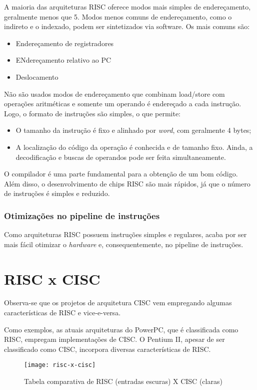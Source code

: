 A maioria das arquiteturas RISC oferece modos mais simples de endereçamento, geralmente menos que 5. Modos menos comuns de endereçamento, como o indireto e o indexado, podem ser sintetizados via software. Os mais comuns são:
\begin{itemize}
  \item Endereçamento de registradores
  \item ENdereçamento relativo ao PC
  \item Deslocamento
\end{itemize}

Não são usados modos de endereçamento que combinam load/store com operações aritméticas e somente um operando é endereçado a cada instrução. Logo, o formato de instruções são simples, o que permite:
\begin{itemize}
  \item O tamanho da instrução é fixo e alinhado por \textit{word}, com geralmente 4 bytes;

  \item A localização do código da operação é conhecida e de tamanho fixo. Ainda, a decodificação e buscas de operandos pode ser feita simultaneamente.
\end{itemize}

O compilador é uma parte fundamental para a obtenção de um bom código. Além disso, o desenvolvimento de chips RISC são mais rápidos, já que o número de instruções é simples e reduzido.




\subsubsection{Otimizações no pipeline de instruções}
Como arquiteturas RISC possuem instruções simples e regulares, acaba por ser mais fácil otimizar o \textit{hardware} e, consequentemente, no pipeline de instruções.





\section{RISC x CISC}
Observa-se que os projetos de arquitetura CISC vem empregando algumas características de RISC e vice-e-versa.

Como exemplos, as atuais arquiteturas do PowerPC, que é classificada como RISC, empregam implementações de CISC. O Pentium II, apesar de ser classificado como CISC, incorpora diversas características de RISC.

\begin{figure}[ht]
  \centering
  \texttt{[image: risc-x-cisc]}
  \label{fig:risc-x-cisc}
  \caption{Tabela comparativa de RISC (entradas escuras) X CISC (claras)}
\end{figure}
